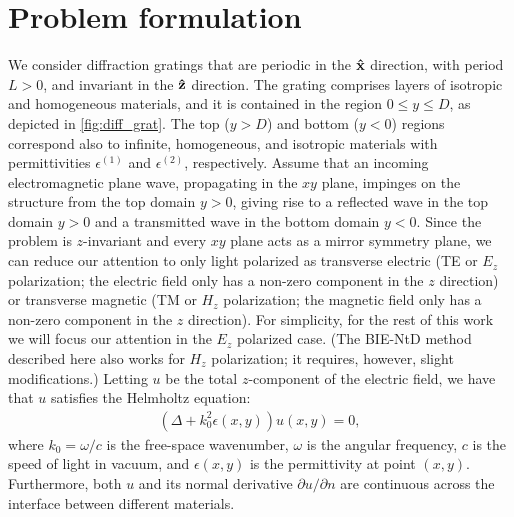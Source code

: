 \documentclass[reprint,amsmath,amssymb,
 aps]{revtex4-2}
\newcommand{\bh}[1]{\bold{\hat{#1}}}
\begin{document}
\section{Problem formulation}\label{sec:problem_form}
We consider diffraction gratings that are periodic in the $\bh{x}$ direction, with period $L > 0$, and invariant in the $\bh{z}$ direction. The grating comprises layers of isotropic and homogeneous materials, and it is contained in the region $0 \leq y \leq D$, as depicted in \cref{fig:diff_grat}. The top ($y > D$) and bottom ($y < 0$) regions correspond also to infinite, homogeneous, and isotropic materials with permittivities $\epsilon^{(1)}$ and $\epsilon^{(2)}$, respectively. Assume that an incoming electromagnetic plane wave, propagating in the $xy$ plane, impinges on the structure from the top domain $y > 0$, giving rise to a reflected wave in the top domain $y > 0$ and a transmitted wave in the bottom domain $y < 0$. Since the problem is $z$-invariant and every $xy$ plane acts as a mirror symmetry plane, we can reduce our attention to only light polarized as transverse electric (TE or $E_z$ polarization; the electric field only has a non-zero component in the $z$ direction) or transverse magnetic (TM or $H_z$ polarization; the magnetic field only has a non-zero component in the $z$ direction). For simplicity, for the rest of this work we will focus our attention in the $E_z$ polarized case. (The BIE-NtD method described here also works for $H_z$ polarization; it requires, however, slight modifications.) Letting $u$ be the total $z$-component of the electric field, we have that $u$ satisfies the Helmholtz equation:
\begin{eqnarray}
(\Delta + k_0^2\epsilon(x,y))u(x,y) = 0,
\end{eqnarray}
where $k_0 = \omega/c$ is the free-space wavenumber, $\omega$ is the angular frequency, $c$ is the speed of light in vacuum, and $\epsilon(x,y)$ is the permittivity at point $(x,y)$. Furthermore, both $u$ and its normal derivative $\partial u/\partial n$ are continuous across the interface between different materials. 
\end{document}
